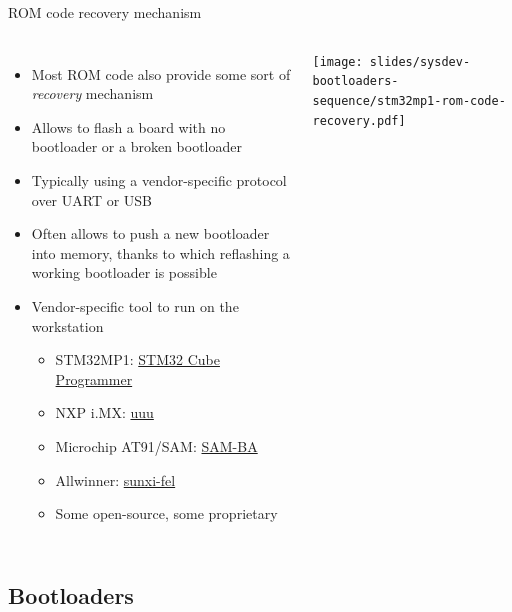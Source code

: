 \begin{frame}{ROM code recovery mechanism}
  \begin{columns}
    \begin{itemize}
    \item Most ROM code also provide some sort of {\em recovery}
      mechanism
    \item Allows to flash a board with no bootloader or a broken
      bootloader
    \item Typically using a vendor-specific protocol over UART or USB
    \item Often allows to push a new bootloader into memory, thanks to
      which reflashing a working bootloader is possible
    \item Vendor-specific tool to run on the workstation
      \begin{itemize}
      \item STM32MP1: \href{https://www.st.com/en/development-tools/stm32cubeprog.html}{STM32 Cube Programmer}
      \item NXP i.MX: \href{https://github.com/NXPmicro/mfgtools}{uuu}
      \item Microchip AT91/SAM: \href{https://www.microchip.com/en-us/development-tool/SAM-BA-In-system-Programmer}{SAM-BA}
      \item Allwinner: \href{https://github.com/linux-sunxi/sunxi-tools}{sunxi-fel}
      \item Some open-source, some proprietary
      \end{itemize}
    \end{itemize}
    \texttt{[image: slides/sysdev-bootloaders-sequence/stm32mp1-rom-code-recovery.pdf]}
  \end{columns}
\end{frame}

\subsection{Bootloaders}

